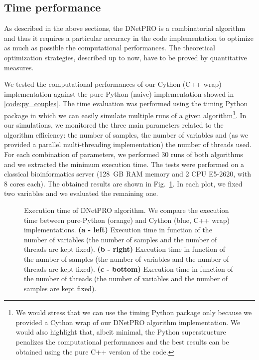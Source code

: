 \documentclass{standalone}
\begin{document}
\subsection[Time performance]{Time performance}\label{implementation:timing}

As described in the above sections, the \textsf{DNetPRO} is a combinatorial algorithm and thus it requires a particular accuracy in the code implementation to optimize as much as possible the computational performances.
The theoretical optimization strategies, described up to now, have to be proved by quantitative measures.

We tested the computational performances of our \textsf{Cython} (\textsf{C++} wrap) implementation against the pure \textsf{Python} (naive) implementation showed in \ref{code:py_couples}.
The time evaluation was performed using the \textsf{timing} \textsf{Python} package in which we can easily simulate multiple runs of a given algorithm\footnote{
  We would stress that we can use the \textsf{timing} \textsf{Python} package only because we provided a \textsf{Cython} wrap of our \textsf{DNetPRO} algorithm implementation.
  We would also highlight that, albeit minimal, the \textsf{Python} superstructure penalizes the computational performances and the best results can be obtained using the pure \textsf{C++} version of the code.
}.
In our simulations, we monitored the three main parameters related to the algorithm efficiency: the number of samples, the number of variables and (as we provided a parallel multi-threading implementation) the number of threads used.
For each combination of parameters, we performed 30 runs of both algorithms and we extracted the minimum execution time.
The tests were performed on a classical bioinformatics server (128~GB RAM memory and 2 CPU E5-2620, with 8 cores each).
The obtained results are shown in Fig.~\ref{fig:dnetpro_timing}.
In each plot, we fixed two variables and we evaluated the remaining one.

\begin{figure}[htbp]
\hspace{-1.0cm}
\def\svgwidth{0.45\textwidth}

\qquad
\hspace{1.0cm}
\def\svgwidth{0.45\textwidth}

\qquad\qquad
\centering
\def\svgwidth{0.7\textwidth}

\caption{Execution time of \textsf{DNetPRO} algorithm.
We compare the execution time between pure-\textsf{Python} (orange) and \textsf{Cython} (blue, \textsf{C++} wrap) implementations.
\textbf{(a - left)} Execution time in function of the number of variables (the number of samples and the number of threads are kept fixed).
\textbf{(b - right)} Execution time in function of the number of samples (the number of variables and the number of threads are kept fixed).
\textbf{(c - bottom)} Execution time in function of the number of threads (the number of variables and the number of samples are kept fixed).
}
\label{fig:dnetpro_timing}
\end{figure}
\end{document}
